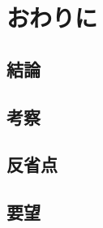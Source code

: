 \documentclass[titlepage,a4paper]{jsarticle}
\begin{document}
\section{おわりに}
\subsection{結論}
\subsection{考察}
\subsection{反省点}
\subsection{要望}
\end{document}
